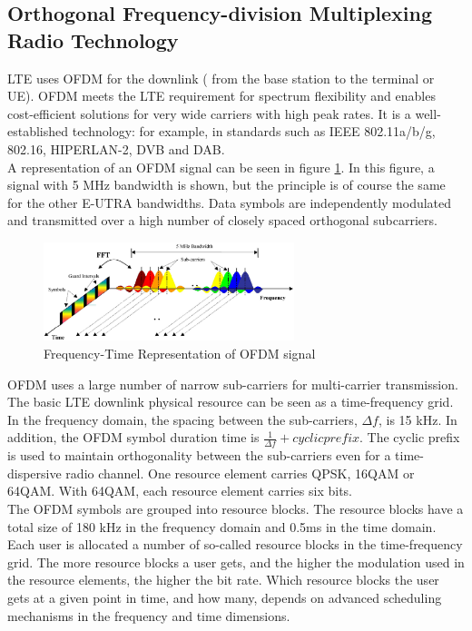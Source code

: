 \subsection{Orthogonal Frequency-division Multiplexing Radio Technology} %

LTE uses OFDM for the downlink ( from the base station to the terminal or UE).
OFDM meets the LTE requirement for spectrum flexibility and enables cost-efficient
solutions for very wide carriers with high peak rates. It is a well-established
technology: for example, in standards such as IEEE 802.11a/b/g, 802.16, HIPERLAN-2,
DVB and DAB.\cite{introlte} \cite{umtslte}\\

A representation of an OFDM signal can be seen in figure \ref{fig:ofdmfreq}. In
this figure, a signal with 5 MHz bandwidth is shown, but the principle is of
course the same for the other E-UTRA bandwidths. Data symbols are independently
modulated and transmitted over a high number of closely spaced orthogonal
subcarriers.\\

\begin{figure}[htbp]
    \centering
    \includegraphics[width=0.65\textwidth]{./figures/ofdm_frequency}
    \caption{ Frequency-Time Representation of OFDM signal
    \label{fig:ofdmfreq}}
\end{figure}

OFDM uses a large number of narrow sub-carriers for multi-carrier transmission.
The basic LTE downlink physical resource can be seen as a time-frequency grid.
In the frequency domain, the spacing between the sub-carriers, $\Delta f$, is 15
kHz. In addition, the OFDM symbol duration time is $\frac{1}{\Delta f} + cyclic prefix$.
The cyclic prefix is used to maintain orthogonality between the sub-carriers even
for a time-dispersive radio channel. One resource element carries QPSK, 16QAM or
64QAM. With 64QAM, each resource element carries six bits.\\

The OFDM symbols are grouped into resource blocks. The resource blocks have a
total size of 180 kHz in the frequency domain and 0.5ms in the time domain. Each
user is allocated a number of so-called resource blocks in the time-frequency grid.
The more resource blocks a user gets, and the higher the modulation used in the
resource elements, the higher the bit rate. Which resource blocks the user gets
at a given point in time, and how many, depends on advanced scheduling mechanisms
in the frequency and time dimensions.\\

